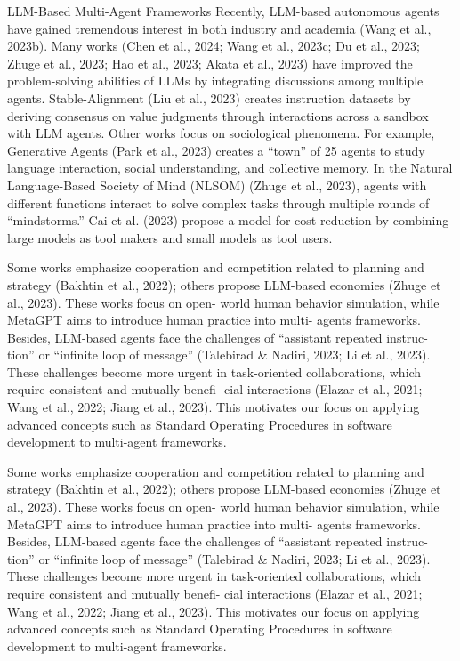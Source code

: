 \documentclass[12pt]{article}
\begin{document}
LLM-Based Multi-Agent Frameworks Recently, LLM-based autonomous agents have gained
tremendous interest in both industry and academia (Wang et al., 2023b). Many works (Chen et al.,
2024; Wang et al., 2023c; Du et al., 2023; Zhuge et al., 2023; Hao et al., 2023; Akata et al., 2023)
have improved the problem-solving abilities of LLMs by integrating discussions among multiple
agents. Stable-Alignment (Liu et al., 2023) creates instruction datasets by deriving consensus on
value judgments through interactions across a sandbox with LLM agents. Other works focus on
sociological phenomena. For example, Generative Agents (Park et al., 2023) creates a “town” of 25
agents to study language interaction, social understanding, and collective memory. In the Natural
Language-Based Society of Mind (NLSOM) (Zhuge et al., 2023), agents with different functions
interact to solve complex tasks through multiple rounds of “mindstorms.” Cai et al. (2023) propose
a model for cost reduction by combining large models as tool makers and small models as tool users.


Some works emphasize cooperation and competition related to planning and strategy (Bakhtin et al.,
2022); others propose LLM-based economies (Zhuge et al., 2023). These works focus on open-
world human behavior simulation, while MetaGPT aims to introduce human practice into multi-
agents frameworks. Besides, LLM-based agents face the challenges of “assistant repeated instruc-
tion” or “infinite loop of message” (Talebirad & Nadiri, 2023; Li et al., 2023). These challenges
become more urgent in task-oriented collaborations, which require consistent and mutually benefi-
cial interactions (Elazar et al., 2021; Wang et al., 2022; Jiang et al., 2023). This motivates our focus
on applying advanced concepts such as Standard Operating Procedures in software development to
multi-agent frameworks.


Some works emphasize cooperation and competition related to planning and strategy (Bakhtin et al.,
2022); others propose LLM-based economies (Zhuge et al., 2023). These works focus on open-
world human behavior simulation, while MetaGPT aims to introduce human practice into multi-
agents frameworks. Besides, LLM-based agents face the challenges of “assistant repeated instruc-
tion” or “infinite loop of message” (Talebirad \& Nadiri, 2023; Li et al., 2023). These challenges
become more urgent in task-oriented collaborations, which require consistent and mutually benefi-
cial interactions (Elazar et al., 2021; Wang et al., 2022; Jiang et al., 2023). This motivates our focus
on applying advanced concepts such as Standard Operating Procedures in software development to
multi-agent frameworks.
\end{document}
